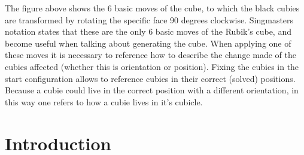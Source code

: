 \documentclass{article}
\begin{document}
\vspace{40pt}
\begin{figure}[h]
\hspace{-1cm}
{
\hspace{-1cm}
}
\end{figure}
\vspace{20pt}
\newline The figure above shows the 6 basic moves of the cube, to which the black cubies are transformed by rotating the specific face 90 degrees clockwise. Singmasters \cite{Magic} notation states that these are the only 6 basic moves of the Rubik's cube, and become useful when talking about generating the cube. When applying one of these moves it is necessary to reference how to describe the change made of the cubies affected (whether this is orientation or position). Fixing the cubies in the start configuration allows to reference cubies in their correct (solved) positions. Because a cubie could live in the correct position with a different orientation, in this way one refers to how a cubie lives in it's cubicle.

\section{Introduction}
\end{document}
